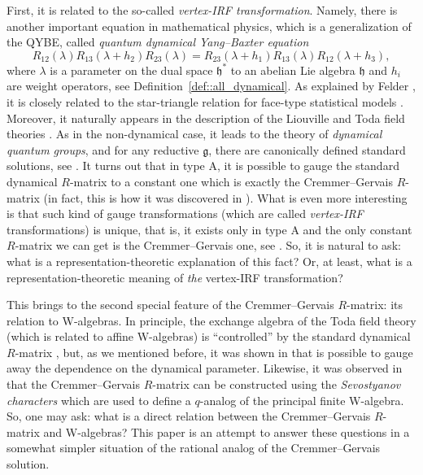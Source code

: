 \documentclass[10pt,a4paper]{article}
\numberwithin{equation}{section}
\newcommand{\g}{\mathfrak{g}}
\newcommand{\h}{\mathfrak{h}}
\begin{document}
First, it is related to the so-called \emph{vertex-IRF transformation}. Namely, there is another important equation in mathematical physics, which is a generalization of the QYBE, called \emph{quantum dynamical Yang--Baxter equation}
	\[
	R_{12}(\lambda) R_{13}(\lambda+h_2) R_{23} (\lambda)= R_{23}(\lambda + h_1) R_{13}(\lambda) R_{12}(\lambda + h_3),
	\]
	where $\lambda$ is a parameter on the dual space $\h^*$ to an abelian Lie algebra $\h$ and $h_i$ are weight operators, see Definition~\ref{def::all_dynamical}. As explained by Felder \cite{Felder}, it is closely related to the star-triangle relation for face-type statistical models \cite{Baxter}. Moreover, it naturally appears in the description of the Liouville and Toda field theories \cite{GervaisNeveu}. As in the non-dynamical case, it leads to the theory of \emph{dynamical quantum groups}, and for any reductive $\g$, there are canonically defined standard solutions, see \cite{EtingofICM,EtingofSchiffmann}. It turns out that in type A, it is possible to gauge the standard dynamical $R$-matrix to a constant one which is exactly the Cremmer--Gervais $R$-matrix (in fact, this is how it was discovered in \cite{CremmerGervais}). What is even more interesting is that such kind of gauge transformations (which are called \emph{vertex-IRF} transformations) is unique, that is, it exists only in type A and the only constant $R$-matrix we can get is the Cremmer--Gervais one, see \cite{BalogDabrowskiFeher}. So, it is natural to ask: what is a representation-theoretic explanation of this fact? Or, at least, what is a representation-theoretic meaning of \emph{the} vertex-IRF transformation?
	
	This brings to the second special feature of the Cremmer--Gervais $R$-matrix: its relation to W-algebras. In principle, the exchange algebra of the Toda field theory (which is related to affine W-algebras) is ``controlled'' by the standard dynamical $R$-matrix \cite{GervaisNeveu}, but, as we mentioned before, it was shown in \cite{CremmerGervais} that is possible to gauge away the dependence on the dynamical parameter. Likewise, it was observed in \cite{BuffenoirRocheTerrasAffine} that the Cremmer--Gervais $R$-matrix can be constructed using the \emph{Sevostyanov characters} \cite{SevostyanovWhittakerModules} which are used to define a $q$-analog of the principal finite W-algebra. So, one may ask: what is a direct relation between the Cremmer--Gervais $R$-matrix and W-algebras? This paper is an attempt to answer these questions in a somewhat simpler situation of the rational analog of the Cremmer--Gervais solution.
	
\end{document}
